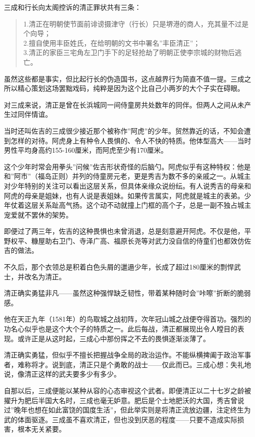 \documentclass[
]{book}
\begin{document}
三成和行长向太阁控诉的清正罪状共有三条：

\begin{quote}
1.清正在明朝使节面前诽谤摄津守（行长）只是堺港的商人，充其量不过是个向导；\\
2.擅自使用丰臣姓氏，在给明朝的文书中署名''丰臣清正''；\\
3.清正的家臣三宅角左卫门手下的足轻抢劫了明朝正使李宗城的财物后逃亡。
\end{quote}

虽然这些都是事实，但比起行长的伪造国书，这点越界行为简直不值一提。三成之所以精心策划这场罢黜戏码，纯粹是因为这个比自己小两岁的大个子实在碍眼。

对三成来说，清正是曾在长浜城同一间侍童房共处数年的同伴。但两人之间从未产生过同伴情谊。

当时还叫佐吉的三成很少接近那个被称作''阿虎''的少年。贸然靠近的话，不知会遭到怎样的对待。阿虎身上有种令人畏惧的、令人不快的特质。他体型高大------当时男性平均身高约155-160厘米，而阿虎至少有170厘米。

这个少年时常会用拳头''问候''佐吉形状奇怪的后脑勺。阿虎似乎有这种特权：他是和''阿市''（福岛正则）并列的侍童房元老，更是秀吉为数不多的亲戚之一。从城主对少年特别的关注可以看出这层关系，但具体亲缘众说纷纭。有人说秀吉的母亲和阿虎的母亲是姐妹，也有人说是表姐妹。如果传言属实，阿虎就是城主的表弟。少年仗着这层关系趾高气扬。这个动不动就撞上门框的高个子，总是一副不独占城主宠爱就不罢休的架势。

即便过了两三年，佐吉的这种畏惧也未曾消退，总是刻意避开阿虎。不仅是他，平野权平、糠屋助右卫门、寺泽广高、福原长尧等对武力没自信的侍童们也都效仿佐吉的做法。

不久后，那个衣领总是积着白色头屑的邋遢少年，长成了超过180厘米的剽悍武士，并改名为清正。

清正确实勇猛非凡------虽然这种强悍缺乏韧性，带着某种随时会''咔嚓''折断的脆弱感。

他在天正九年（1581年）的鸟取城之战初阵，次年冠山城之战便夺得首功。强烈的功名心似乎也是这个大个子的特质之一。此后每战，清正都展现出令人瞠目的表现。或许正是从这时起，三成心中那份挥之不去的畏惧逐渐淡薄了。

清正确实勇猛，但似乎不擅长把握战争全局的政治运作。不能纵横捭阖于政治军事者，难称将才。说到底，清正只是个勇敢的战士------仅此而已。三成心想：失礼地说，像清正这样的武夫要多少有多少。

自那以后，三成便能以某种从容的心态审视这个武者。即便清正以二十七岁之龄被擢升为肥后半国大名时，三成也毫无妒意。肥后是个土地肥沃的大国，秀吉曾说过''晚年也想在如此富饶的国度生活''，但此举实则是将清正流放边疆，注定终生为武的体面驱逐。三成虽不喜欢清正，但也没到厌恶的程度------只要不造成实际损害，根本无关紧要。
\end{document}
